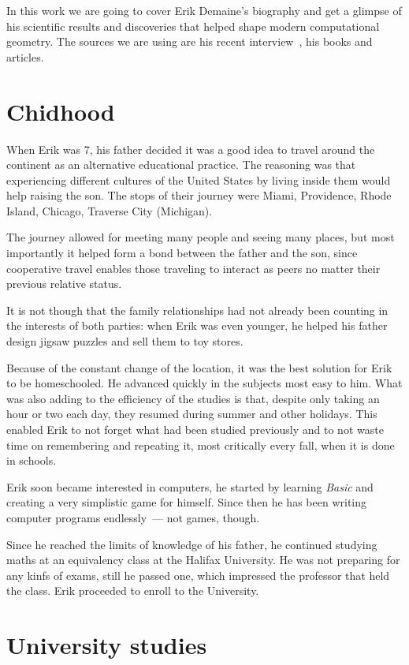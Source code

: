 \documentclass[a4paper,12pt]{article}
\begin{document}
In this work we are going to cover Erik Demaine's biography and get a glimpse of his scientific results and discoveries that helped shape modern computational geometry. The sources we are using are his recent interview~\cite{yt}, his books and articles.

\section{Chidhood}

When Erik was 7, his father decided it was a good idea to travel around the continent as an alternative educational practice. The reasoning was that experiencing different cultures of the United States by living inside them would help raising the son. The stops of their journey were Miami, Providence, Rhode Island, Chicago, Traverse City (Michigan).

The journey allowed for meeting many people and seeing many places, but most importantly it helped form a bond between the father and the son, since cooperative travel enables those traveling to interact as peers no matter their previous relative status.

It is not though that the family relationships had not already been counting in the interests of both parties: when Erik was even younger, he helped his father design jigsaw puzzles and sell them to toy stores.

Because of the constant change of the location, it was the best solution for Erik to be homeschooled. He advanced quickly in the subjects most easy to him. What was also adding to the efficiency of the studies is that, despite only taking an hour or two each day, they resumed during summer and other holidays. This enabled Erik to not forget what had been studied previously and to not waste time on remembering and repeating it, most critically every fall, when it is done in schools.

Erik soon became interested in computers, he started by learning {\it Basic} and creating a very simplistic game for himself. Since then he has been writing computer programs endlessly~— not games, though.

Since he reached the limits of knowledge of his father, he continued studying maths at an equivalency class at the Halifax University. He was not preparing for any kinfs of exams, still he passed one, which impressed the professor that held the class. Erik proceeded to enroll to the University.

\section{University studies}
\end{document}
